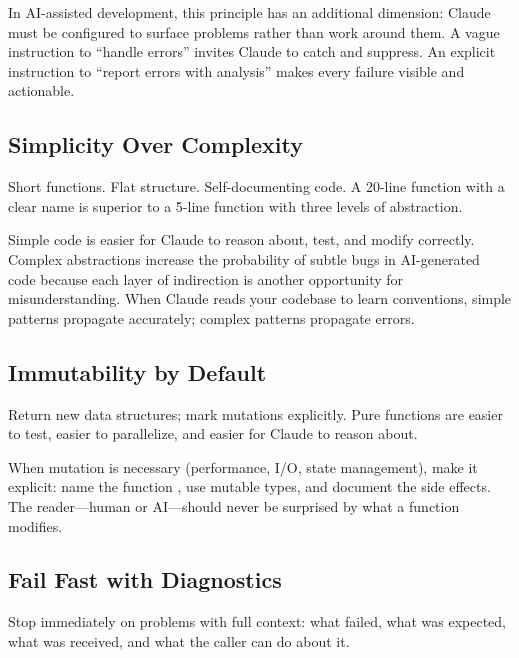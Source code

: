 In AI-assisted development, this principle has an additional dimension:
Claude must be configured to surface problems rather than work around them.
A vague instruction to ``handle errors'' invites Claude to catch and suppress.
An explicit instruction to ``report errors with analysis'' makes every failure
visible and actionable.

\subsection{Simplicity Over Complexity}

Short functions. Flat structure. Self-documenting code.
A 20-line function with a clear name is superior to a 5-line function
with three levels of abstraction.


\begin{whybox}
Simple code is easier for Claude to reason about, test, and modify correctly.
Complex abstractions increase the probability of subtle bugs in AI-generated
code because each layer of indirection is another opportunity for
misunderstanding. When Claude reads your codebase to learn conventions,
simple patterns propagate accurately; complex patterns propagate errors.
\end{whybox}

\subsection{Immutability by Default}

Return new data structures; mark mutations explicitly.
Pure functions are easier to test, easier to parallelize,
and easier for Claude to reason about.

When mutation is necessary (performance, I/O, state management),
make it explicit: name the function , use mutable types,
and document the side effects. The reader---human or AI---should
never be surprised by what a function modifies.

\subsection{Fail Fast with Diagnostics}

Stop immediately on problems with full context:
what failed, what was expected, what was received,
and what the caller can do about it.

